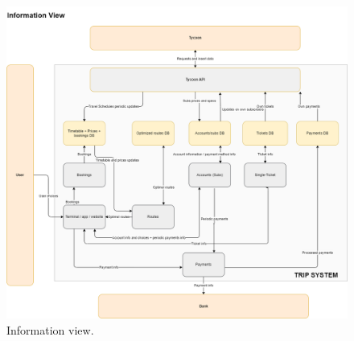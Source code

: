 \begin{figure}[H]
    \centering
    \includegraphics[width=\textwidth]{drawings/views_final_version/information_view.png}
    \caption{Information view.}
    \label{fig:information_view}
\end{figure}
